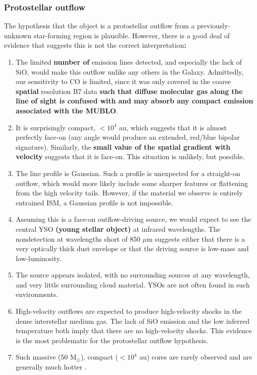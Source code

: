 \documentclass[]{aastex631}
\newcommand{\msun}{\ensuremath{\mathrm{M}_\odot}\xspace}
\def\rr#1{\textbf{#1}}
\begin{document}
\subsubsection{Protostellar outflow}
\label{sec:protostellaroutflow}
The hypothesis that the object is a protostellar outflow from a previously-unknown star-forming region is plausible.
However, there is a good deal of evidence that suggests this is not the correct interpretation\rr{:}
\begin{enumerate}
    \item  The limited \rr{number of} emission lines detected, and especially the lack of SiO, would make this outflow unlike any others in the Galaxy.  Admittedly, our sensitivity to CO is limited, since it was only covered in the coarse \rr{spatial} resolution B7 data \rr{such that diffuse molecular gas along the line of sight is confused with and may absorb any compact emission associated with the MUBLO}.
    \item It is surprisingly compact, $<10^4$ au, which suggests that it is almost perfectly face-on (any angle would produce an extended, red/blue bipolar signature).  Similarly, the \rr{small value of the spatial gradient with velocity} suggests that it is face-on.  This situation is unlikely, but possible.  
    \item The line profile is Gaussian.  Such a profile is unexpected for a straight-on outflow, which would more likely include some sharper features or flattening from the high velocity tails.  However, if the material we observe is entirely entrained ISM, a Gaussian profile is not impossible.
    \item Assuming this is a face-on outflow-driving source, we would expect to see the central YSO \rr{(young stellar object)} at infrared wavelengths.  The nondetection at wavelengths short of 850 $\mu$m suggests either that there is a very optically thick dust envelope or that the driving source is low-mass and low-luminosity.
    \item The source appears isolated, with no surrounding sources at any wavelength, and very little surrounding cloud material.  YSOs are not often found in such environments.
    \item High-velocity outflows are expected to produce high-velocity shocks in the dense interstellar medium gas.  The lack of SiO emission and the low inferred temperature both imply that there are no high-velocity shocks.  This evidence is the most problematic for the protostellar outflow hypothesis. 
    \item Such massive (50 \msun), compact ($<10^4$ au) cores are rarely observed and are generally much hotter \citep[e.g.,][]{Bonfand2017,Bonfand2024,Jeff2024,Budaiev2024}.
\end{enumerate}
\end{document}
